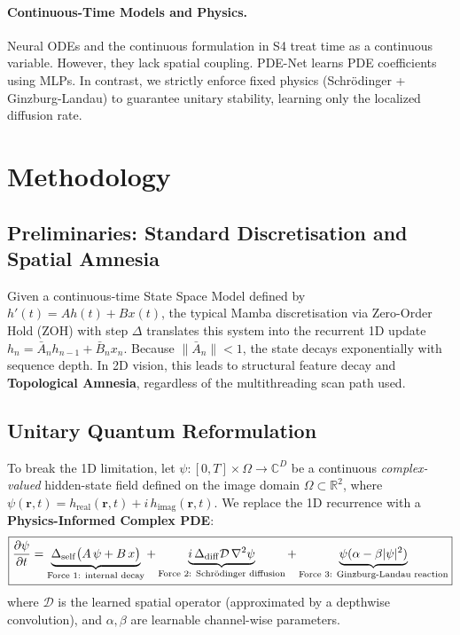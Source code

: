 \documentclass{article}
\newcommand{\BoxedEq}[1]{\fbox{$\displaystyle #1$}}
\begin{document}
\paragraph{Continuous-Time Models and Physics.}
Neural ODEs \citep{chen2018neuralode} and the continuous formulation in S4 \citep{gu2021s4} treat time as a continuous variable. However, they lack spatial coupling. PDE-Net \citep{long2018pde} learns PDE coefficients using MLPs. In contrast, we strictly enforce fixed physics (Schrödinger + Ginzburg-Landau) to guarantee unitary stability, learning only the localized diffusion rate.

\section{Methodology}

\subsection{Preliminaries: Standard Discretisation and Spatial Amnesia}
Given a continuous-time State Space Model defined by $h'(t) = A h(t) + B x(t)$,
the typical Mamba discretisation via Zero-Order Hold (ZOH) with step $\Delta$ translates this system into the recurrent 1D update $h_n = \bar{A}_n h_{n-1} + \bar{B}_n x_n$.
Because $\|\bar{A}_n\| < 1$, the state decays exponentially with sequence depth. In 2D vision, this leads to structural feature decay and \textbf{Topological Amnesia}, regardless of the multithreading scan path used.

\subsection{Unitary Quantum Reformulation}
\label{sec:pde}

To break the 1D limitation, let $\psi : [0,T] \times \Omega \to \mathbb{C}^D$ be a continuous \emph{complex-valued} hidden-state field defined on the image domain $\Omega \subset \mathbb{R}^2$, where $\psi(\mathbf{r},t) = h_{\mathrm{real}}(\mathbf{r},t) + i\,h_{\mathrm{imag}}(\mathbf{r},t)$.
We replace the 1D recurrence with a \textbf{Physics-Informed Complex PDE}:
\begin{equation}
  \BoxedEq{
    \frac{\partial \psi}{\partial t} = 
    \underbrace{\Delta_{\mathrm{self}} \bigl(A\,\psi + B\,x\bigr)}_{\text{Force 1: internal decay}}
    + \underbrace{i\,\Delta_{\mathrm{diff}} \mathcal{D}\,\nabla^2 \psi}_{\text{Force 2: Schrödinger diffusion}}
    + \underbrace{\psi(\alpha - \beta|\psi|^2)}_{\text{Force 3: Ginzburg-Landau reaction}}
  }
  \label{eq:cs-mamba-pde}
\end{equation}
where $\mathcal{D}$ is the learned spatial operator (approximated by a depthwise convolution), and $\alpha, \beta$ are learnable channel-wise parameters.
\end{document}
